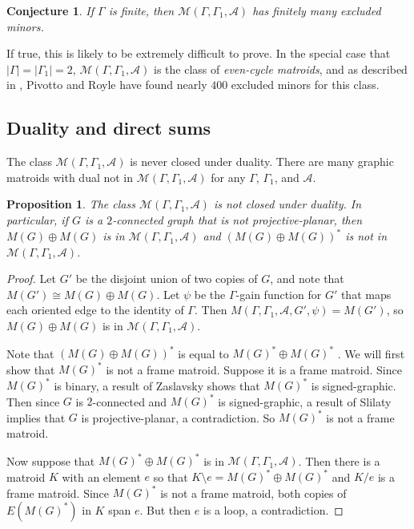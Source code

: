 \documentclass[12pt]{article}
\newtheorem{proposition}[theorem]{Proposition}
\newtheorem{conjecture}[theorem]{Conjecture}
\theoremstyle{definition}
\newcommand{\cA}{\mathcal{A}}
\newcommand{\cM}{\mathcal{M}}
\newcommand{\del}{\!\setminus\!}
\begin{document}
\begin{conjecture} \label{conj: excluded minors finite case}
If $\Gamma$ is finite, then $\cM(\Gamma, \Gamma_1, \cA)$ has finitely many excluded minors.
\end{conjecture}

If true, this is likely to be extremely difficult to prove. 
In the special case that $|\Gamma| = |\Gamma_1| = 2$, $\cM(\Gamma, \Gamma_1, \cA)$ is the class of \emph{even-cycle matroids}, and as described in \cite{Grace-vanZwam-2019}, Pivotto and Royle have found nearly $400$ excluded minors for this class.



\subsection{Duality and direct sums}

The class $\cM(\Gamma, \Gamma_1, \cA)$ is never closed under duality.
There are many graphic matroids with dual not in $\cM(\Gamma, \Gamma_1, \cA)$ for any $\Gamma$, $\Gamma_1$, and $\cA$.

\begin{proposition} \label{prop: duality}
The class $\cM(\Gamma, \Gamma_1, \cA)$ is not closed under duality.
In particular, if $G$ is a $2$-connected graph that is not projective-planar, then $M(G) \oplus M(G)$ is in  $\cM(\Gamma, \Gamma_1, \cA)$ and $(M(G) \oplus M(G))^*$ is not in $\cM(\Gamma, \Gamma_1, \cA)$.
\end{proposition}
\begin{proof}
Let $G'$ be the disjoint union of two copies of $G$, and note that $M(G') \cong M(G) \oplus M(G)$.
Let $\psi$ be the $\Gamma$-gain function for $G'$ that maps each oriented edge to the identity of $\Gamma$.
Then $M(\Gamma, \Gamma_1, \cA, G', \psi) = M(G')$, so $M(G) \oplus M(G)$ is in  $\cM(\Gamma, \Gamma_1, \cA)$.


Note that $(M(G) \oplus M(G))^*$ is equal to $M(G)^* \oplus M(G)^*$ \cite[Proposition 4.2.21]{Oxley2011}.
We will first show that $M(G)^*$ is not a frame matroid.
Suppose it is a frame matroid.
Since $M(G)^*$ is binary, a result of Zaslavsky \cite[Corollary 3.2]{Zaslavsky-1987} shows that $M(G)^*$ is signed-graphic.
Then since $G$ is $2$-connected and $M(G)^*$ is signed-graphic, a result of Slilaty \cite[Theorem 3]{Slilaty-2005} implies that $G$ is projective-planar, a contradiction.
So $M(G)^*$ is not a frame matroid.

Now suppose that $M(G)^* \oplus M(G)^*$ is in $\cM(\Gamma, \Gamma_1, \cA)$.
Then there is a matroid $K$ with an element $e$ so that $K \del e = M(G)^* \oplus M(G)^*$ and $K/e$ is a frame matroid.
Since $M(G)^*$ is not a frame matroid, both copies of $E(M(G)^*)$ in $K$ span $e$.
But then $e$ is a loop, a contradiction.
\end{proof}
\end{document}
